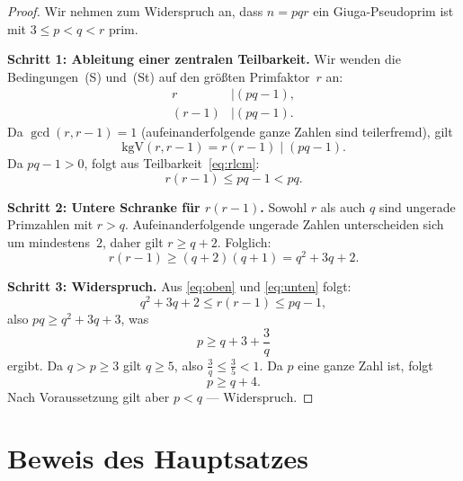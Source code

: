 \documentclass[12pt,a4paper]{amsart}
\theoremstyle{definition}
\begin{document}
\begin{proof}
Wir nehmen zum Widerspruch an, dass $n = pqr$ ein Giuga-Pseudoprim ist
mit $3 \le p < q < r$ prim.

\medskip
\noindent\textbf{Schritt 1: Ableitung einer zentralen Teilbarkeit.}
Wir wenden die Bedingungen~(S) und~(St) auf den größten Primfaktor~$r$ an:
\begin{align}
  r &\mid (pq - 1), \label{eq:rS} \\
  (r - 1) &\mid (pq - 1). \label{eq:rSt}
\end{align}
Da $\gcd(r, r-1) = 1$ (aufeinanderfolgende ganze Zahlen sind teilerfremd), gilt
\begin{equation}
  \text{kgV}(r, r-1) = r(r-1) \mid (pq - 1).
  \label{eq:rlcm}
\end{equation}
Da $pq - 1 > 0$, folgt aus Teilbarkeit~\eqref{eq:rlcm}:
\begin{equation}
  r(r - 1) \le pq - 1 < pq.
  \label{eq:oben}
\end{equation}

\medskip
\noindent\textbf{Schritt 2: Untere Schranke für $r(r-1)$.}
Sowohl $r$ als auch $q$ sind ungerade Primzahlen mit $r > q$. Aufeinanderfolgende
ungerade Zahlen unterscheiden sich um mindestens~$2$, daher gilt $r \ge q + 2$.
Folglich:
\begin{equation}
  r(r - 1) \ge (q + 2)(q + 1) = q^2 + 3q + 2.
  \label{eq:unten}
\end{equation}

\medskip
\noindent\textbf{Schritt 3: Widerspruch.}
Aus \eqref{eq:oben} und \eqref{eq:unten} folgt:
\[
  q^2 + 3q + 2 \le r(r-1) \le pq - 1,
\]
also $pq \ge q^2 + 3q + 3$, was
\[
  p \ge q + 3 + \frac{3}{q}
\]
ergibt. Da $q > p \ge 3$ gilt $q \ge 5$, also
$\tfrac{3}{q} \le \tfrac{3}{5} < 1$. Da $p$ eine ganze Zahl ist, folgt
\[
  p \ge q + 4.
\]
Nach Voraussetzung gilt aber $p < q$ — Widerspruch.
\end{proof}

\section{Beweis des Hauptsatzes}
\end{document}
